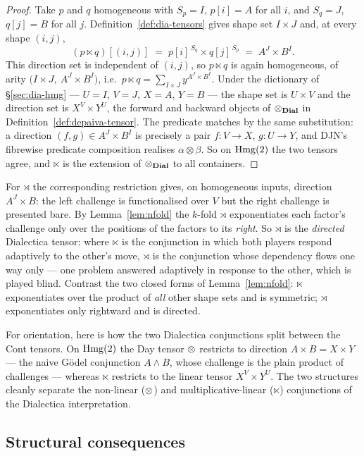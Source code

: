 \begin{proof}
Take $p$ and $q$ homogeneous with $S_p=I$, $p[i]=A$ for all $i$, and $S_q=J$,
$q[j]=B$ for all $j$. Definition~\ref{def:dia-tensors} gives shape set
$I\times J$ and, at every shape $(i,j)$,
\[
  (p\ltimes q)[(i,j)]\;=\;p[i]^{\,S_q}\times q[j]^{\,S_p}
    \;=\;A^{J}\times B^{I}.
\]
This direction set is independent of $(i,j)$, so $p\ltimes q$ is again
homogeneous, of arity $\bigl(I\times J,\ A^{J}\times B^{I}\bigr)$, i.e.\
$p\ltimes q=\sum_{I\times J}y^{A^{J}\times B^{I}}$. Under the dictionary of
§\ref{sec:dia-hmg} --- $U=I$, $V=J$, $X=A$, $Y=B$ --- the shape set is
$U\times V$ and the direction set is $X^{V}\times Y^{U}$, the forward and
backward objects of $\mathbin{\otimes_{\mathbf{Dial}}}$ in Definition~\ref{def:depaiva-tensor}. The
predicate matches by the same substitution: a direction $(f,g)\in A^{J}\times
B^{I}$ is precisely a pair $f\colon V\to X$, $g\colon U\to Y$, and DJN's fibrewise
predicate composition realises $\alpha\otimes\beta$. So on $\mathrm{Hmg}(2)$ the two
tensors agree, and $\ltimes$ is the extension of $\mathbin{\otimes_{\mathbf{Dial}}}$ to all containers.
\end{proof}

For $\rtimes$ the corresponding restriction gives, on homogeneous inputs,
direction $A^{J}\times B$: the left challenge is functionalised over $V$ but the
right challenge is presented bare. By Lemma~\ref{lem:nfold} the $k$-fold
$\rtimes$ exponentiates each factor's challenge only over the positions of the
factors to its \emph{right}. So $\rtimes$ is the \emph{directed} Dialectica
tensor: where $\ltimes$ is the conjunction in which both players respond
adaptively to the other's move, $\rtimes$ is the conjunction whose dependency
flows one way only --- one problem answered adaptively in response to the other,
which is played blind. Contrast the two closed forms of Lemma~\ref{lem:nfold}:
$\ltimes$ exponentiates over the product of \emph{all} other shape sets and is
symmetric; $\rtimes$ exponentiates only rightward and is directed.

For orientation, here is how the two Dialectica conjunctions split between the
Cont tensors. On $\mathrm{Hmg}(2)$ the Day tensor $\mathbin{\otimes}$ restricts to direction
$A\times B=X\times Y$ --- the naive Gödel conjunction $A\wedge B$, whose
challenge is the plain product of challenges --- whereas $\ltimes$ restricts to
the linear tensor $X^{V}\times Y^{U}$. The two structures cleanly separate the
non-linear ($\mathbin{\otimes}$) and multiplicative-linear ($\ltimes$) conjunctions of the
Dialectica interpretation.

\subsection{Structural consequences}
\label{sec:dia-consequences}

